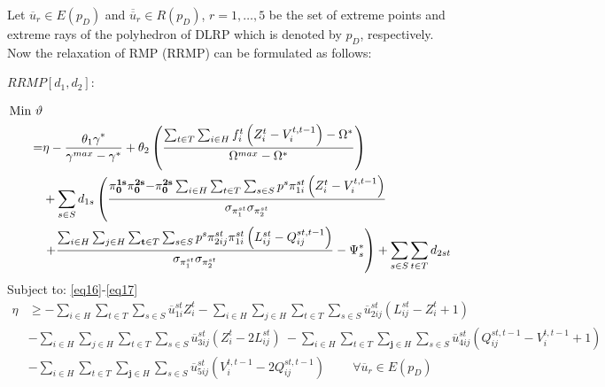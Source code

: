 \documentclass[review]{elsarticle}
\begin{document}
Let $\overline{u}_r\in E(p_D)$ and ${\overline{\overline{u}}}_r\in R\left(p_D\right)$, $r =1,\ldots ,5$ be the set of extreme points and extreme rays of the polyhedron of DLRP which is denoted by $p_D$, respectively. Now the relaxation of RMP (RRMP) can be formulated as follows:

$RRMP\left[d_1,d_2\right]$:

\begin{align*}
{\rm Min}~\vartheta & \\
=&\eta-\frac{{{\theta }_1\gamma }^*}{{\gamma }^{max}-{\gamma }^*}+{\theta }_2\left(\frac{\sum_{t\in T}{\sum_{i\in H}{f^t_i\left(Z^t_i-V^{t,t-1}_i\right)}}-{\Omega }^*}{{\Omega }^{max}-{\Omega }^*}\right)\\
&+\sum_{s\in S}{d_{1s}}\left(\frac{{\mathbf{ \pi }}^{\mathbf{ 1}\mathbf{ s}}_{\mathbf{ 0}}{\mathbf{ \pi }}^{\mathbf{ 2}\mathbf{ s}}_{\mathbf{ 0}}\mathbf{ -}{\mathbf{ \pi }}^{\mathbf{ 2}\mathbf{ s}}_{\mathbf{ 0}}\sum_{i\in H}{\sum_{t\in T}{\sum_{s\in S}{p^s{\pi }^{st}_{1i}\left(Z^t_i-V^{t,t-1}_i\right)}}}}{{\sigma }_{{\pi }^{st}_{1}}{\sigma }_{{\pi }^{st}_{2}}}\right.\\
&\left.+\frac{\sum_{i\in H}{\sum_{j\in H}{\sum_{\mathbf{ t}\in T}{\sum_{s\in S}{p^s{\pi }^{st}_{2ij}{\pi }^{st}_{1i}\left(L^{st}_{ij}-Q^{st,t-1}_{ij}\right)}}}}}{{\sigma }_{{\pi }^{st}_{1}}{\sigma }_{{\pi }^{st}_{2}}}-{\Psi }^*_s\right)+\sum_{s\in S}{\sum_{t\in T}{d_{2st}}}
\end{align*}
Subject to: \eqref{eq16}-\eqref{eq17}
\begin{align}\label{eq42}
\eta &\geq-\sum_{i\in H}{\sum_{t\in T}{\sum_{s\in S}{{\overline{u}}^{st}_{1i}Z^t_i}}}-\sum_{i\in H}{\sum_{j\in H}{\sum_{t\in T}{\sum_{s\in S}{{\overline{u}}^{st}_{2ij}\left(L^{st}_{ij}-Z^t_i+1\right)\ }}}}\nonumber\\
&-\sum_{i\in H}{\sum_{j\in H}{\sum_{t\in T}{\sum_{s\in S}{{\overline{u}}^{st}_{3ij}\left(Z^t_i-2L^{st}_{ij}\right)\ }}}}
-\sum_{i\in H}{\sum_{t\in T}{\sum_{\mathbf{ j}\in H}{\sum_{s\in S}{{\overline{u}}^{st}_{4ij}\left(Q^{st,t-1}_{ij}-V^{t,t-1}_i+1\right)\ }}}}\nonumber\\
&-\sum_{i\in H}{\sum_{t\in T}{\sum_{\mathbf{ j}\in H}{\sum_{s\in S}{{\overline{u}}^{st}_{5ij}\left(V^{t,t-1}_i-2Q^{st,t-1}_{ij}\right)\ }}}}\qquad \forall {\overline{u}}_r\in E\left(p_D\right)
\end{align}
\end{document}
